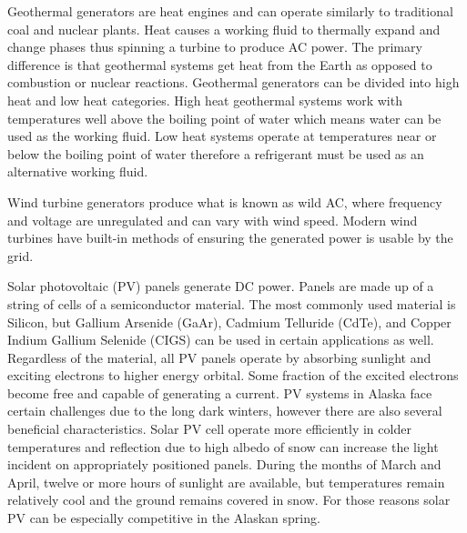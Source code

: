 Geothermal generators are heat engines and can operate similarly to traditional coal and nuclear plants. Heat causes a working fluid to thermally expand and change phases thus spinning a turbine to produce AC power. The primary difference is that geothermal systems get heat from the Earth as opposed to combustion or nuclear reactions. Geothermal generators can be divided into high heat and low heat categories. High heat geothermal systems work with temperatures well above the boiling point of water which means water can be used as the working fluid. Low heat systems operate at temperatures near or below the boiling point of water therefore a refrigerant must be used as an alternative working fluid. 

Wind turbine generators produce what is known as wild AC, where frequency and voltage are unregulated and can vary with wind speed. Modern wind turbines have built-in methods of ensuring the generated power is usable by the grid.

Solar photovoltaic (PV) panels generate DC power. Panels are made up of a string of cells of a semiconductor material. The most commonly used material is Silicon, but Gallium Arsenide (GaAr), Cadmium Telluride (CdTe), and Copper Indium Gallium Selenide (CIGS) can be used in certain applications as well. Regardless of the material, all PV panels operate by absorbing sunlight and exciting electrons to higher energy orbital. Some fraction of the excited electrons become free and capable of generating a current. PV systems in Alaska face certain challenges due to the long dark winters, however there are also several beneficial characteristics. Solar PV cell operate more efficiently in colder temperatures and reflection due to high albedo of snow can increase the light incident on appropriately positioned panels. During the months of March and April, twelve or more hours of sunlight are available, but temperatures remain relatively cool and the ground remains covered in snow. For those reasons solar PV can be especially competitive in the Alaskan spring.

